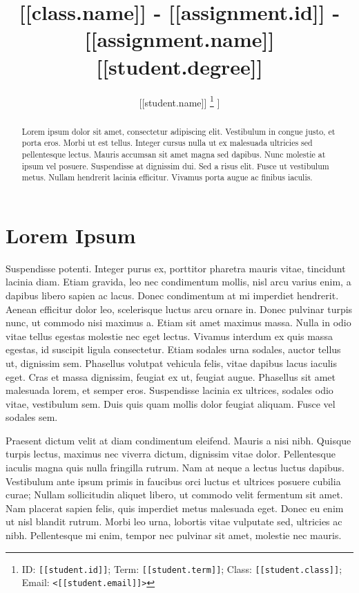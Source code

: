 \documentclass[10pt, letterpaper]{article}
\title{
	[[class.name]] - [[assignment.id]] - [[assignment.name]]\\
 	\large [[student.degree]]
}
\author{
	[[student.name]] \thanks{
		ID: \texttt{[[student.id]]};
		Term: \texttt{[[student.term]]};
		Class: \texttt{[[student.class]]};
		Email: \texttt{<[[student.email]]>}
	} \authorcr
	[[student.school]]
}
\theoremstyle{definition}
\begin{document}
	\maketitle
	
	\begin{abstract}
		Lorem \autocite{name} ipsum dolor sit amet, consectetur adipiscing elit. Vestibulum in congue justo, et porta eros. Morbi ut est tellus. Integer cursus nulla ut ex malesuada ultricies sed pellentesque lectus. Mauris accumsan sit amet magna sed dapibus. Nunc molestie at ipsum vel posuere. Suspendisse at dignissim dui. Sed a risus elit. Fusce ut vestibulum metus. Nullam hendrerit lacinia efficitur. Vivamus porta augue ac finibus iaculis.
	\end{abstract}

	
	\section{Lorem Ipsum}
	
	
	Suspendisse potenti. Integer purus ex, porttitor pharetra mauris vitae, tincidunt lacinia diam. Etiam gravida, leo nec condimentum mollis, nisl arcu varius enim, a dapibus libero sapien ac lacus. Donec condimentum at mi imperdiet hendrerit. Aenean efficitur dolor leo, scelerisque luctus arcu ornare in. Donec pulvinar turpis nunc, ut commodo nisi maximus a. Etiam sit amet maximus massa. Nulla in odio vitae tellus egestas molestie nec eget lectus. Vivamus interdum ex quis massa egestas, id suscipit ligula consectetur. Etiam sodales urna sodales, auctor tellus ut, dignissim sem. Phasellus volutpat vehicula felis, vitae dapibus lacus iaculis eget. Cras et massa dignissim, feugiat ex ut, feugiat augue. Phasellus sit amet malesuada lorem, et semper eros. Suspendisse lacinia ex ultrices, sodales odio vitae, vestibulum sem. Duis quis quam mollis dolor feugiat aliquam. Fusce vel sodales sem.
	
	Praesent dictum velit at diam condimentum eleifend. Mauris a nisi nibh. Quisque turpis lectus, maximus nec viverra dictum, dignissim vitae dolor. Pellentesque iaculis magna quis nulla fringilla rutrum. Nam at neque a lectus luctus dapibus. Vestibulum ante ipsum primis in faucibus orci luctus et ultrices posuere cubilia curae; Nullam sollicitudin aliquet libero, ut commodo velit fermentum sit amet. Nam placerat sapien felis, quis imperdiet metus malesuada eget. Donec eu enim ut nisl blandit rutrum. Morbi leo urna, lobortis vitae vulputate sed, ultricies ac nibh. Pellentesque mi enim, tempor nec pulvinar sit amet, molestie nec mauris. 
	
	\clearpage
	
	
	\printbibliography[title = {Bibliography}]
	
	\tableofcontents
	
\end{document}
